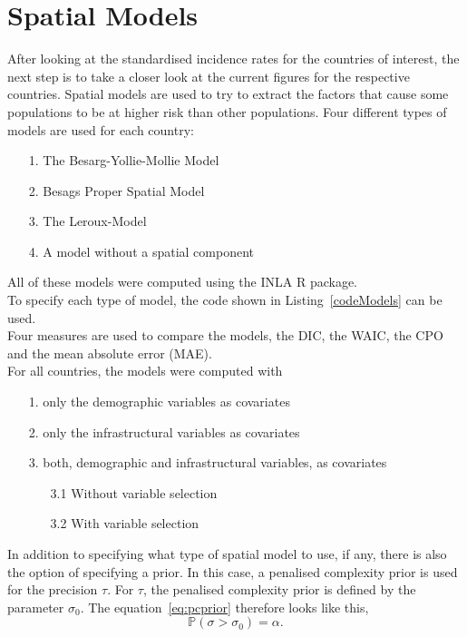 \section{Spatial Models}
After looking at the standardised incidence rates for the countries of interest, the next step is to take a closer look at the current figures for the respective countries. Spatial models are used to try to extract the factors that cause some populations to be at higher risk than other populations. Four different types of models are used for each country:
\begin{itemize}
    \item[1.] The Besarg-Yollie-Mollie Model
    \item[2.] Besags Proper Spatial Model
    \item[3.] The Leroux-Model
    \item[4.] A model without a spatial component
\end{itemize}
All of these models were computed using the INLA \cite{rinla} R package. \\
To specify each type of model, the code shown in Listing~\ref{codeModels} can be used. \\
Four measures are used to compare the models, the DIC, the WAIC, the CPO and the mean absolute error (MAE).\\
For all countries, the models were computed with
\begin{itemize}
    \item[1.] only the demographic variables as covariates
    \item[2.] only the infrastructural variables as covariates
    \item[3.] both, demographic and infrastructural variables, as covariates
    \begin{itemize}
        \item[3.1] Without variable selection
        \item[3.2] With variable selection
    \end{itemize}
\end{itemize}
In addition to specifying what type of spatial model to use, if any, there is also the option of specifying a prior. In this case, a penalised complexity prior is used for the precision $\tau$. For $\tau$, the penalised complexity prior is defined by the parameter $\sigma_0$. The equation~\ref{eq:pcprior} therefore looks like this,
\begin{equation}\label{pcprec}
    \mathbb{P}\left(\sigma > \sigma_0\right)=\alpha.
\end{equation}
